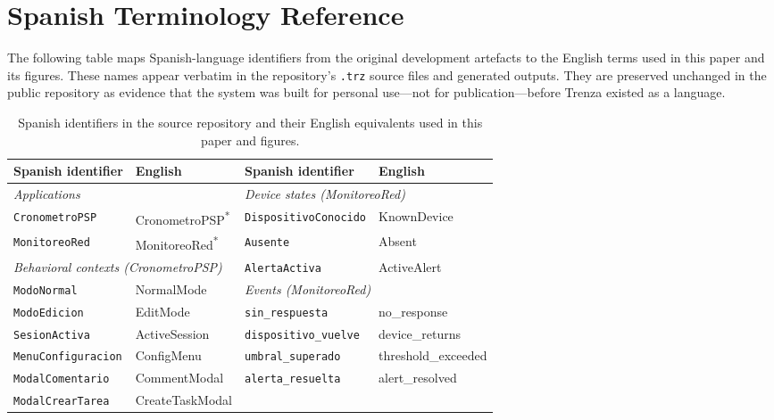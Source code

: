 \section{Spanish Terminology Reference}
\label{sec:glossary}

The following table maps Spanish-language identifiers from the original
development artefacts to the English terms used in this paper and its figures.
These names appear verbatim in the repository's \texttt{.trz} source files and
generated outputs. They are preserved unchanged in the public repository as
evidence that the system was built for personal use---not for
publication---before Trenza existed as a language.

\begin{table}[t]
  \centering
  \caption{Spanish identifiers in the source repository and their English
           equivalents used in this paper and figures.}
  \label{tab:glossary}
  \footnotesize
  \begin{tabular}{p{3.8cm}p{2.9cm}@{\hskip 1.5em\vrule\hskip 1.5em}p{3.8cm}p{2.9cm}}
    \toprule
    \textbf{Spanish identifier} & \textbf{English} &
    \textbf{Spanish identifier} & \textbf{English} \\
    \midrule
    \multicolumn{2}{l}{\textit{Applications}} &
    \multicolumn{2}{l}{\textit{Device states (MonitoreoRed)}} \\
    \texttt{CronometroPSP}   & CronometroPSP\textsuperscript{*} &
    \texttt{DispositivoConocido} & KnownDevice \\
    \texttt{MonitoreoRed}    & MonitoreoRed\textsuperscript{*} &
    \texttt{Ausente}             & Absent \\
    \multicolumn{2}{l}{\textit{Behavioral contexts (CronometroPSP)}} &
    \texttt{AlertaActiva}        & ActiveAlert \\
    \texttt{ModoNormal}      & NormalMode &
    \multicolumn{2}{l}{\textit{Events (MonitoreoRed)}} \\
    \texttt{ModoEdicion}     & EditMode &
    \texttt{sin\_respuesta}      & no\_response \\
    \texttt{SesionActiva}    & ActiveSession &
    \texttt{dispositivo\_vuelve} & device\_returns \\
    \texttt{MenuConfiguracion} & ConfigMenu &
    \texttt{umbral\_superado}    & threshold\_exceeded \\
    \texttt{ModalComentario} & CommentModal &
    \texttt{alerta\_resuelta}    & alert\_resolved \\
    \texttt{Modal\-CrearTarea} & CreateTaskModal &

\end{tabular}
\end{table}
